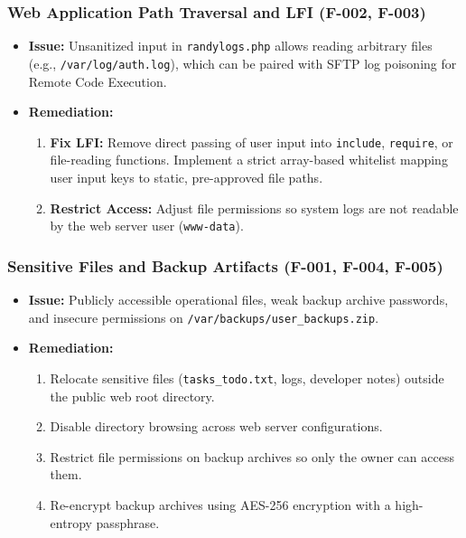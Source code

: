\subsubsection{Web Application Path Traversal and LFI (F-002, F-003)}
\begin{itemize}
    \item \textbf{Issue:} Unsanitized input in \texttt{randylogs.php} allows reading arbitrary files (e.g., \texttt{/var/log/auth.log}), which can be paired with SFTP log poisoning for Remote Code Execution.
    \item \textbf{Remediation:}
    \begin{enumerate}
        \item \textbf{Fix LFI:} Remove direct passing of user input into \texttt{include}, \texttt{require}, or file-reading functions. Implement a strict array-based whitelist mapping user input keys to static, pre-approved file paths.
        \item \textbf{Restrict Access:} Adjust file permissions so system logs are not readable by the web server user (\texttt{www-data}).
    \end{enumerate}
\end{itemize}

\subsubsection{Sensitive Files and Backup Artifacts (F-001, F-004, F-005)}
\begin{itemize}
    \item \textbf{Issue:} Publicly accessible operational files, weak backup archive passwords, and insecure permissions on \texttt{/var/backups/user\_backups.zip}.
    \item \textbf{Remediation:}
    \begin{enumerate}
        \item Relocate sensitive files (\texttt{tasks\_todo.txt}, logs, developer notes) outside the public web root directory.
        \item Disable directory browsing across web server configurations.
        \item Restrict file permissions on backup archives so only the owner can access them.
        \item Re-encrypt backup archives using AES-256 encryption with a high-entropy passphrase.
    \end{enumerate}
\end{itemize}

